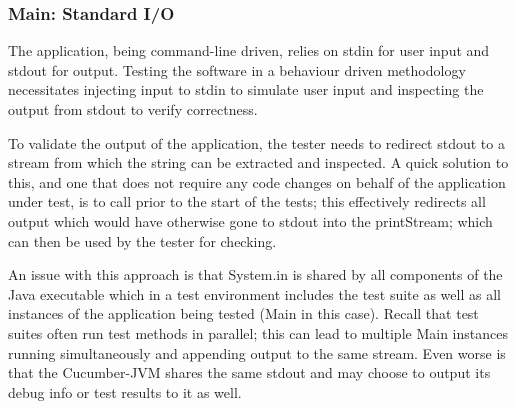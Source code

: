 \subsubsection{Main: Standard I/O}
\label{sec:main-stdio}
The application, being command-line driven, relies on stdin for user input and stdout for output. Testing the software in a behaviour driven methodology necessitates injecting input to stdin to simulate user input and inspecting the output from stdout to verify correctness. 
\par
To validate the output of the application, the tester needs to redirect stdout to a stream from which the string can be extracted and inspected. A quick solution to this, and one that does not require any code changes on behalf of the application under test, is to call  prior to the start of the tests; this effectively redirects all output which would have otherwise gone to stdout into the printStream; which can then be used by the tester for checking. 
\par
An issue with this approach is that System.in is shared by all components of the Java executable which in a test environment includes the test suite as well as all instances of the application being tested (Main in this case). Recall that test suites often run test methods in parallel; this can lead to multiple Main instances running simultaneously and appending output to the same stream. Even worse is that the Cucumber-JVM shares the same stdout and may choose to output its debug info or test results to it as well. 
\par 

